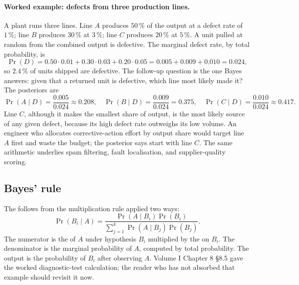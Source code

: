 \paragraph{Worked example: defects from three production lines.}
A plant runs three lines. Line $A$ produces $50\,\%$ of the
output at a defect rate of $1\,\%$; line $B$ produces $30\,\%$ at
$3\,\%$; line $C$ produces $20\,\%$ at $5\,\%$. A unit pulled at
random from the combined output is defective. The marginal defect
rate, by total probability, is
\[
\Pr(D) = 0.50 \cdot 0.01 + 0.30 \cdot 0.03 + 0.20 \cdot 0.05
= 0.005 + 0.009 + 0.010 = 0.024,
\]
so $2.4\,\%$ of units shipped are defective. The follow-up question
is the one Bayes answers: given that a returned unit is defective,
which line most likely made it? The posteriors are
\[
\Pr(A \mid D) = \frac{0.005}{0.024} \approx 0.208, \quad
\Pr(B \mid D) = \frac{0.009}{0.024} = 0.375, \quad
\Pr(C \mid D) = \frac{0.010}{0.024} \approx 0.417.
\]
Line $C$, although it makes the smallest share of output, is the
most likely source of any given defect, because its high defect
rate outweighs its low volume. An engineer who allocates
corrective-action effort by output share would target line $A$
first and waste the budget; the posterior says start with line $C$.
The same arithmetic underlies spam filtering, fault localisation,
and supplier-quality scoring.

\subsection{Bayes' rule}

The  follows from the multiplication rule
applied two ways:
\[
\Pr(B_{i} \mid A) = \frac{\Pr(A \mid B_{i}) \Pr(B_{i})}
{\sum_{j=1}^{k} \Pr(A \mid B_{j}) \Pr(B_{j})}.
\]
The numerator is the  of $A$ under hypothesis
$B_{i}$ multiplied by the  on $B_{i}$. The
denominator is the marginal probability of $A$, computed by total
probability. The output is the  probability of
$B_{i}$ after observing $A$. Volume I Chapter 8 §8.5 gave the
worked diagnostic-test calculation; the reader who has not absorbed
that example should revisit it now.

